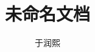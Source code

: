 \documentclass[12pt,a4paper]{extarticle}
\begin{document}
\title{未命名文档}
\author{于润熙}
\maketitle
\end{document}
